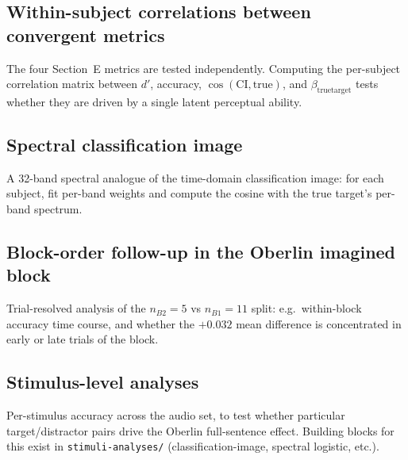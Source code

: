 \documentclass[11pt]{article}
\begin{document}
\subsection{Within-subject correlations between convergent metrics}

The four Section~E metrics are tested independently. Computing the
per-subject correlation matrix between $d'$, accuracy, $\cos(\mathrm{CI},
\text{true})$, and $\beta_{\text{truetarget}}$ tests whether they are
driven by a single latent perceptual ability.

\subsection{Spectral classification image}

A 32-band spectral analogue of the time-domain classification image: for
each subject, fit per-band weights and compute the cosine with the true
target's per-band spectrum.

\begin{center}
\end{center}

\subsection{Block-order follow-up in the Oberlin imagined block}

Trial-resolved analysis of the $n_{B2}=5$ vs $n_{B1}=11$ split: e.g.\
within-block accuracy time course, and whether the $+0.032$ mean
difference is concentrated in early or late trials of the block.

\subsection{Stimulus-level analyses}

Per-stimulus accuracy across the audio set, to test whether particular
target/distractor pairs drive the Oberlin full-sentence effect.
Building blocks for this exist in \texttt{stimuli-analyses/}
(classification-image, spectral logistic, etc.).
\end{document}
